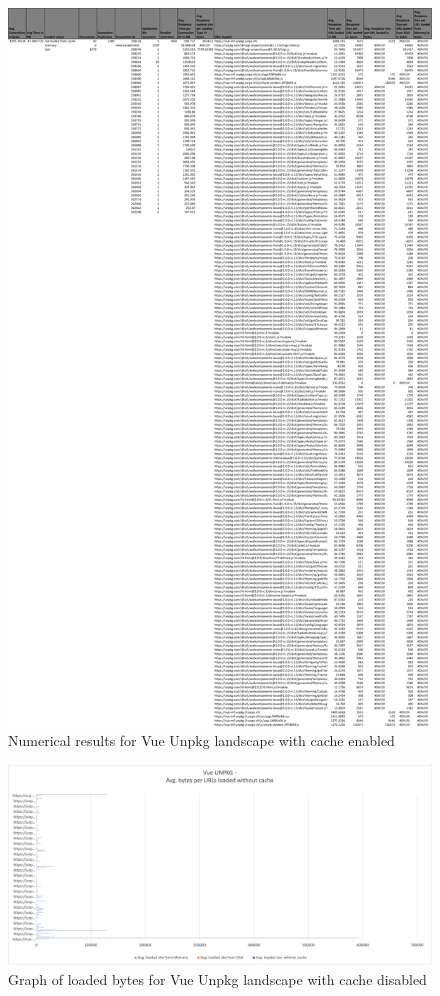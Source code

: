 \newpage
\begin{figure}[!h]
	\centering
	\begin{adjustbox}{width=\textwidth,totalheight=0.95\textheight}
		\includegraphics[angle=90]{Figures/vue_unpkg_allhar_cache.pdf}
	\end{adjustbox}
	\caption{Numerical results for Vue Unpkg landscape with cache enabled}
	\label{fig:appendix_1_17}
\end{figure}
\newpage
\begin{figure}[!h]
	\centering
	\includegraphics[width=1.4\textwidth, angle=90]{Figures/vue_unpkg_bytes.png}
	\caption{Graph of loaded bytes for Vue Unpkg landscape with cache disabled}
	\label{fig:appendix_1_18}
\end{figure}
